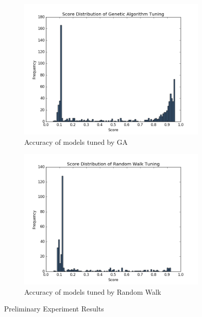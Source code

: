 \begin{figure}[H]
	\begin{subfigure}[b]{0.45\linewidth}
		\includegraphics[width=\linewidth]{sections/imgs/ga/score_distribution.png}
		\caption{Accuracy of models tuned by GA}
		\label{fig:ga_tuning_score_distribution}
	\end{subfigure}
	\begin{subfigure}[b]{0.45\linewidth}
		\includegraphics[width=\linewidth]{sections/imgs/random_walk/score_distribution.png}
		\caption{Accuracy of models tuned by Random Walk}
		\label{fig:rw_tuning_score_distribution}
	\end{subfigure}
	\caption{Preliminary Experiment Results}
	\label{fig:prelim_results}
\end{figure}


